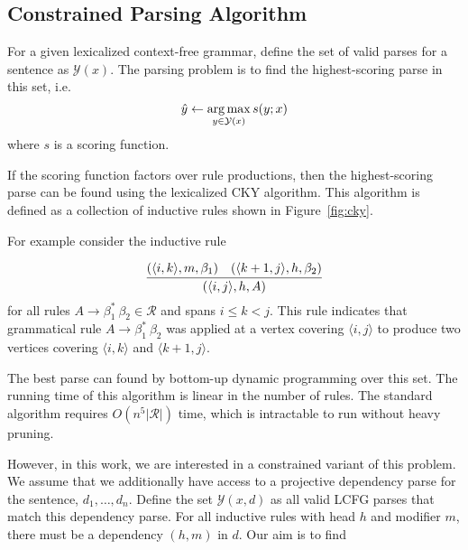 \documentclass[11pt,letterpaper]{article}
\DeclareMathOperator*{\argmax}{arg\,max}
\newcommand{\rules}{\mathcal{R}}
\newcommand{\Span}[1]{\langle #1 \rangle}
\newcommand{\Rule}[3]{#1 \rightarrow #2\ #3}
\newcommand{\RuleA}[3]{#1 \rightarrow #2^*\ #3}
\begin{document}




\subsection{Constrained Parsing Algorithm}


For a given lexicalized context-free grammar,
define the set of valid parses for a sentence as $\mathcal{Y}(x)$.
The parsing problem is to find the highest-scoring parse in this set, i.e.  \[ \hat{y} \gets \argmax_{y \in {\cal Y}(x)} s(y;x) \] where
$s$ is a scoring function.

If the scoring function factors over rule productions, then
the highest-scoring parse can be found using the lexicalized
CKY algorithm. This algorithm is defined as a
collection of inductive rules shown in Figure~\ref{fig:cky}.

For example consider the inductive rule

\[ \infer{(\Span{i, j}, h, A)}{(\Span{i, k}, m, \beta_1) &  (\Span{k+1, j}, h, \beta_2)} \]
 for all rules $\RuleA{A}{\beta_1}{\beta_2}\in \rules$ and spans $i \leq k < j$. This rule indicates that grammatical rule $\RuleA{A}{\beta_1}{\beta_2}$  was applied at a vertex covering $\Span{i, j}$ to produce two vertices covering $\Span{i, k}$ and $\Span{k+1, j}$.

 The best parse can found by bottom-up dynamic programming
 over this set. The running time of this algorithm is linear in the
 number of rules. The standard algorithm requires $O(n^5 |\rules|)$ time, which is intractable to run without heavy pruning.



 However, in this work, we are interested in a constrained variant of
 this problem. We assume that we additionally have access to a
 projective dependency parse for the sentence, $d_1, \ldots, d_n$.
 Define the set $\mathcal{Y}(x,d)$ as all valid LCFG parses that match
 this dependency parse. For all inductive rules with head $h$ and modifier
$m$, there must be a dependency $(h, m)$ in $d$.  Our aim is to find
\end{document}
